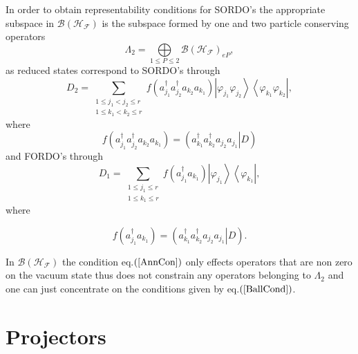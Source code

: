\documentclass[aps,preprint]{revtex4}%
\begin{document}
In order to obtain representability conditions for SORDO's the appropriate
subspace in $\mathcal{B}\left(  \mathcal{H}_{\mathcal{F}}\right)  $ is the
subspace formed by one and two particle conserving operators
\begin{equation}
\Lambda_{2}=%
{\displaystyle\bigoplus\limits_{1\leq P\leq2}}
\mathcal{B}\left(  \mathcal{H}_{\mathcal{F}}\right)  _{eP},
\end{equation}
as reduced states correspond to SORDO's through%
\begin{equation}
D_{2}=\sum_{\substack{1\leq j_{1}<j_{2}\leq r\\1\leq k_{1}<k_{2}\leq
r}}f\left(  a_{j_{1}}^{\dagger}a_{j_{2}}^{\dagger}a_{k_{2}}a_{k_{1}}\right)
\left\vert \varphi_{j_{1}}\varphi_{j_{2}}\right\rangle \left\langle
\varphi_{k_{1}}\varphi_{k_{2}}\right\vert ,
\end{equation}
where%
\begin{equation}
f\left(  a_{j_{1}}^{\dagger}a_{j_{2}}^{\dagger}a_{k_{2}}a_{k_{1}}\right)
=\left(  \left.  a_{k_{1}}^{\dagger}a_{k_{2}}^{\dagger}a_{j_{2}}a_{j_{1}%
}\right\vert D\right)
\end{equation}
and FORDO's through
\begin{equation}
D_{1}=\sum_{\substack{1\leq j_{1}\leq r\\1\leq k_{1}\leq r}}f\left(  a_{j_{1}%
}^{\dagger}a_{k_{1}}\right)  \left\vert \varphi_{j_{1}}\right\rangle
\left\langle \varphi_{k_{1}}\right\vert ,
\end{equation}
where%

\begin{equation}
f\left(  a_{j_{1}}^{\dagger}a_{k_{1}}\right)  =\left(  \left.  a_{k_{1}%
}^{\dagger}a_{k_{2}}^{\dagger}a_{j_{2}}a_{j_{1}}\right\vert D\right)  .
\end{equation}


In $\mathcal{B}\left(  \mathcal{H}_{\mathcal{F}}\right)  $ the condition
eq.$\left(  \ref{AnnCon}\right)  $ only effects operators that are non zero on
the vacuum state thus does not constrain any operators belonging to
$\Lambda_{2}$ and one can just concentrate on the conditions given by
eq.$\left(  \ref{BallCond}\right)  $.

\section{Projectors \label{Projectors}}
\end{document}
